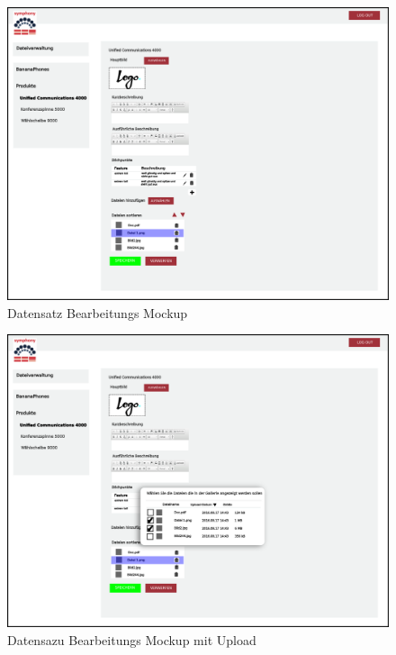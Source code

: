 \documentclass[a4paper,12pt]{article}
\begin{document}
\begin{figure}[!htb]
  \centering
     \includegraphics[width=1.0\textwidth]{projmicro_edit.png}
  \caption{Datensatz Bearbeitungs Mockup}
  \label{fig:edit}
\end{figure}

\begin{figure}[!htb]
  \centering
     \includegraphics[width=1.0\textwidth]{projmicro_edit_dateiauswahl.png}
  \caption{Datensazu Bearbeitungs Mockup mit Upload}
  \label{fig:edit_file}
\end{figure}
\end{document}
